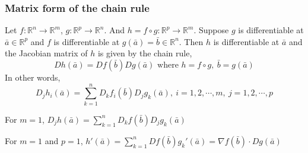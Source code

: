 \subsubsection{Matrix form of the chain rule}
Let $f : \mathbb{R}^n \to \mathbb{R}^m$, $g : \mathbb{R}^p \to \mathbb{R}^n$.
And $h = f \circ g : \mathbb{R}^p \to \mathbb{R}^m$.
Suppose $g$ is differentiable at $\bar{a} \in \mathbb{R}^p$ and $f$ is differentiable at $g(\bar{a}) = \bar{b} \in \mathbb{R}^n$.
Then $h$ is differentiable at $\bar{a}$ and the Jacobian matrix of $h$ is given by the chain rule,
\[ Dh(\bar{a}) = Df(\bar{b})Dg(\bar{a}) \text{ where } h = f \circ g,\ \bar{b} = g(\bar{a})\]
In other words,
\[ D_jh_i(\bar{a}) = \sum_{k=1}^n D_k f_i(\bar{b}) D_j g_k(\bar{a}),\ i=1,2,\cdots,m,\ j=1,2,\cdots,p \]

For $m=1$, $D_j h(\bar{a}) = \sum\limits_{k=1}^n D_kf(\bar{b}) D_jg_k(\bar{a})$

For $m=1$ and $p=1$, $h'(\bar{a}) = \sum\limits_{k=1}^n Df(\bar{b}) g_k'(\bar{a}) = \nabla f(\bar{b}) \cdot Dg(\bar{a})$

